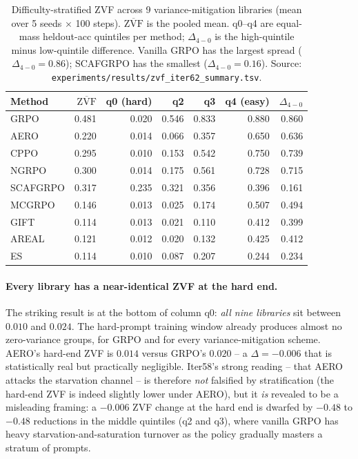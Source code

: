 \documentclass{article}
\begin{document}
\begin{table}[htbp]
\centering
\small
\setlength{\tabcolsep}{3pt}
\begin{tabular}{lrrrrrr}
\hline
Method & $\overline{\mathrm{ZVF}}$ & q0 (hard) & q2 & q3 & q4 (easy) & $\Delta_{4-0}$ \\
\hline
GRPO     & 0.481 & 0.020 & 0.546 & 0.833 & 0.880 & 0.860 \\
AERO     & 0.220 & 0.014 & 0.066 & 0.357 & 0.650 & 0.636 \\
CPPO     & 0.295 & 0.010 & 0.153 & 0.542 & 0.750 & 0.739 \\
NGRPO    & 0.300 & 0.014 & 0.175 & 0.561 & 0.728 & 0.715 \\
SCAFGRPO & 0.317 & 0.235 & 0.321 & 0.356 & 0.396 & 0.161 \\
MCGRPO   & 0.146 & 0.013 & 0.025 & 0.174 & 0.507 & 0.494 \\
GIFT     & 0.114 & 0.013 & 0.021 & 0.110 & 0.412 & 0.399 \\
AREAL    & 0.121 & 0.012 & 0.020 & 0.132 & 0.425 & 0.412 \\
ES       & 0.114 & 0.010 & 0.087 & 0.207 & 0.244 & 0.234 \\
\hline
\end{tabular}
\caption{Difficulty-stratified ZVF across 9 variance-mitigation
libraries (mean over 5 seeds $\times$ 100 steps). $\overline{\mathrm{ZVF}}$
is the pooled mean. q0--q4 are equal-mass heldout-acc quintiles per
method; $\Delta_{4-0}$ is the high-quintile minus low-quintile
difference. Vanilla GRPO has the largest spread ($\Delta_{4-0}{=}0.86$);
SCAFGRPO has the smallest ($\Delta_{4-0}{=}0.16$). Source:
\texttt{experiments/results/zvf\_iter62\_summary.tsv}.}
\label{tab:zvf-strat}
\end{table}

\paragraph{Every library has a near-identical ZVF at the hard end.}
The striking result is at the bottom of column q0: \emph{all nine
libraries} sit between $0.010$ and $0.024$. The hard-prompt
training window already produces almost no zero-variance groups, for
GRPO and for every variance-mitigation scheme. AERO's hard-end ZVF
is $0.014$ versus GRPO's $0.020$ -- a $\Delta = -0.006$ that is
statistically real but practically negligible. Iter58's strong
reading -- that AERO attacks the starvation channel -- is therefore
\emph{not} falsified by stratification (the hard-end ZVF is indeed
slightly lower under AERO), but it \emph{is} revealed to be a
misleading framing: a $-0.006$ ZVF change at the hard end is dwarfed
by $-0.48$ to $-0.48$ reductions in the middle quintiles (q2 and
q3), where vanilla GRPO has heavy starvation-and-saturation turnover
as the policy gradually masters a stratum of prompts.
\end{document}
